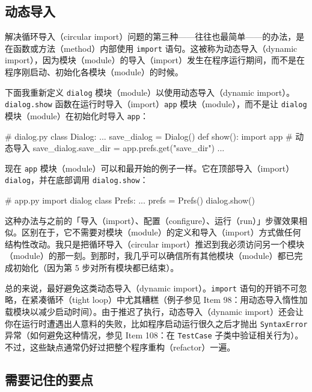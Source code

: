 \subsection{动态导入}

解决循环导入（circular import）问题的第三种——往往也最简单——的办法，是在函数或方法（method）内部使用 \texttt{import} 语句。这被称为动态导入（dynamic import），因为模块（module）的导入（import）发生在程序运行期间，而不是在程序刚启动、初始化各模块（module）的时候。

下面我重新定义 \texttt{dialog} 模块（module）以使用动态导入（dynamic import）。\texttt{dialog.show} 函数在运行时导入（import）\texttt{app} 模块（module），而不是让 \texttt{dialog} 模块（module）在初始化时导入 \texttt{app}：

\begin{codebox}[python]
# dialog.py
class Dialog:
    ...
save_dialog = Dialog()
def show():
    import app  # 动态导入
    save_dialog.save_dir = app.prefs.get("save_dir")
    ...
\end{codebox}

现在 \texttt{app} 模块（module）可以和最开始的例子一样。它在顶部导入（import）\texttt{dialog}，并在底部调用 \texttt{dialog.show}：

\begin{codebox}[python]
# app.py
import dialog
class Prefs:
    ...
prefs = Prefs()
dialog.show()
\end{codebox}

这种办法与之前的「导入（import）、配置（configure）、运行（run）」步骤效果相似。区别在于，它不需要对模块（module）的定义和导入（import）方式做任何结构性改动。我只是把循环导入（circular import）推迟到我必须访问另一个模块（module）的那一刻。到那时，我几乎可以确信所有其他模块（module）都已完成初始化（因为第 5 步对所有模块都已结束）。

总的来说，最好避免这类动态导入（dynamic import）。\texttt{import} 语句的开销不可忽略，在紧凑循环（tight loop）中尤其糟糕（例子参见 Item 98：用动态导入惰性加载模块以减少启动时间）。由于推迟了执行，动态导入（dynamic import）还会让你在运行时遭遇出人意料的失败，比如程序启动运行很久之后才抛出 \texttt{SyntaxError} 异常（如何避免这种情况，参见 Item 108：在 \texttt{TestCase} 子类中验证相关行为）。不过，这些缺点通常仍好过把整个程序重构（refactor）一遍。

\subsection{需要记住的要点}

